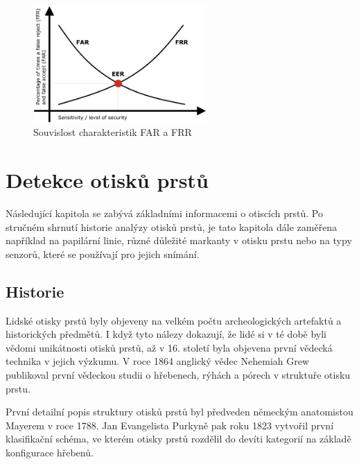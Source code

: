 \begin{figure}[!htbp]
    \centering
    \includegraphics[width=250px]{obrazky-figures/frrfar.jpeg}
    \caption{Souvislost charakteristik FAR a FRR \cite{FARFRR}}
\end{figure}

\chapter{Detekce otisků prstů}
Následující kapitola se zabývá základními informacemi o otiscích prstů. Po stručném shrnutí historie analýzy otisků prstů, je tato kapitola dále zaměřena například na papilární linie, různé důležité markanty v otisku prstu nebo na typy senzorů, které se používají pro jejich snímání.
\section{Historie}
Lidské otisky prstů byly objeveny na velkém počtu archeologických artefaktů a historických předmětů. I když tyto nálezy dokazují, že lidé si v té době byli vědomi unikátnosti otisků prstů, až v 16. století byla objevena první vědecká technika v jejich výzkumu. V roce 1864 anglický vědec Nehemiah Grew publikoval první vědeckou studii o hřebenech, rýhách a pórech v struktuře otisku prstu.

První detailní popis struktury otisků prstů byl předveden německým anatomistou Mayerem v roce 1788. Jan Evangelista Purkyně pak roku 1823 vytvořil první klasifikační schéma, ve kterém otisky prstů rozdělil do devíti kategorií na základě konfigurace hřebenů. \cite{Maltoni2009}

